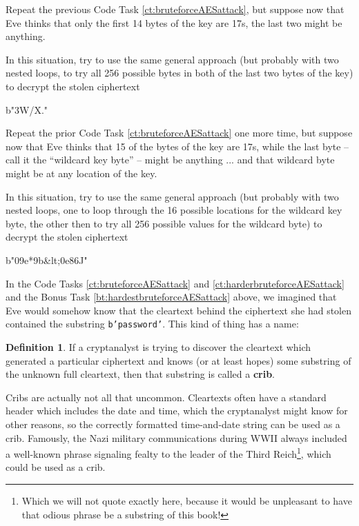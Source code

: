 \documentclass[12pt,letterpaper]{amsbook}
\theoremstyle{definition}
\newtheorem{definition}[theorem]{Definition}
\theoremstyle{remark}
\numberwithin{figure}{section}
\numberwithin{exercise}{chapter}
\numberwithin{section}{chapter}
\numberwithin{equation}{section}
\numberwithin{table}{subsection}
\newcommand{\code}[1]{\colorbox{lg}{\texttt{#1}}}
\newcommand{\ix}[1]{{#1}\index{#1}}
\begin{document}
\vskip2mm
\begin{CTtcb}[label=ct:harderbruteforceAESattack]{}{}
Repeat the previous Code Task \ref{ct:bruteforceAESattack}, but suppose now
that Eve thinks that only the first 14 bytes of the key are 17s, the last two
might be anything.

In this situation, try to use the same general approach (but probably with two
nested loops, to try all 256 possible bytes in both of the last two bytes of
the key) to decrypt the stolen ciphertext\\
\begin{codedisp}
b"\xb3W/X.\xda{}\xed\xde\xedT\xfe"
\end{codedisp}
\end{CTtcb}

\begin{BTtcb}[label=bt:hardestbruteforceAESattack]{}{}
Repeat the prior Code Task \ref{ct:bruteforceAESattack} one more time, but
suppose now that Eve thinks that 15 of the bytes of the key are 17s, while the
last byte -- call it the ``wildcard key byte'' -- might be anything ... and that
wildcard byte might be at any location of the key.

In this situation, try to use the same general approach (but probably with two
nested loops, one to loop through the 16 possible locations for the wildcard key
byte, the other then to try all 256 possible values for the wildcard byte) to
decrypt the stolen ciphertext\\
\begin{codedisp}
b"0\xbd\x9e*\x9b&lt;\xfa\x0e\x86J\xfd@"
\end{codedisp}
\end{BTtcb}

In the Code Tasks \ref{ct:bruteforceAESattack} and \ref{ct:harderbruteforceAESattack} and the Bonus Task \ref{bt:hardestbruteforceAESattack} above, we imagined
that Eve would somehow know that the cleartext behind the ciphertext she had
stolen contained the substring \code{b'password'}.  This kind of thing has a name:
\begin{definition}\label{def:crib}
If a cryptanalyst is trying to discover the cleartext which generated a particular
ciphertext and knows (or at least hopes) some substring of the unknown full
cleartext, then that substring is called a \textbf{\ix{crib}}.
\end{definition}
Cribs are actually not all that uncommon.  Cleartexts often have a standard
header which includes the date and time, which the cryptanalyst might know
for other reasons, so the correctly formatted time-and-date string can be used
as a crib.  Famously, the Nazi military communications during WWII always
included a well-known phrase signaling fealty to the leader of the Third
Reich\footnote{Which we will not quote exactly here, because it would be
unpleasant to have that odious phrase be a substring of this book!}, which
could be used as a crib.
\end{document}

